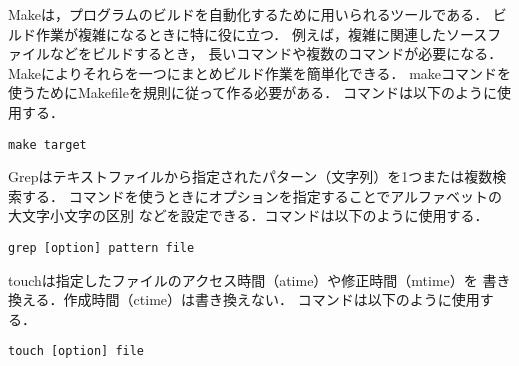 
\homework



\vspace{-\baselineskip}



Makeは，プログラムのビルドを自動化するために用いられるツールである．
ビルド作業が複雑になるときに特に役に立つ．
例えば，複雑に関連したソースファイルなどをビルドするとき，
長いコマンドや複数のコマンドが必要になる．
Makeによりそれらを一つにまとめビルド作業を簡単化できる．
makeコマンドを使うためにMakefileを規則に従って作る必要がある．
コマンドは以下のように使用する．\cite{Make}

\begin{lstlisting}[tabsize=1, numberstyle=\color{white}]
	make target
\end{lstlisting}

\vspace{-\baselineskip}



Grepはテキストファイルから指定されたパターン（文字列）を1つまたは複数検索する．
コマンドを使うときにオプションを指定することでアルファベットの大文字小文字の区別
などを設定できる．コマンドは以下のように使用する．\cite{Grep}

\begin{lstlisting}[tabsize=1, numberstyle=\color{white}]
	grep [option] pattern file
\end{lstlisting}

\vspace{-\baselineskip}



touchは指定したファイルのアクセス時間（atime）や修正時間（mtime）を
書き換える．作成時間（ctime）は書き換えない．
コマンドは以下のように使用する．\cite{touch}

\begin{lstlisting}[tabsize=1, numberstyle=\color{white}]
	touch [option] file
\end{lstlisting}

